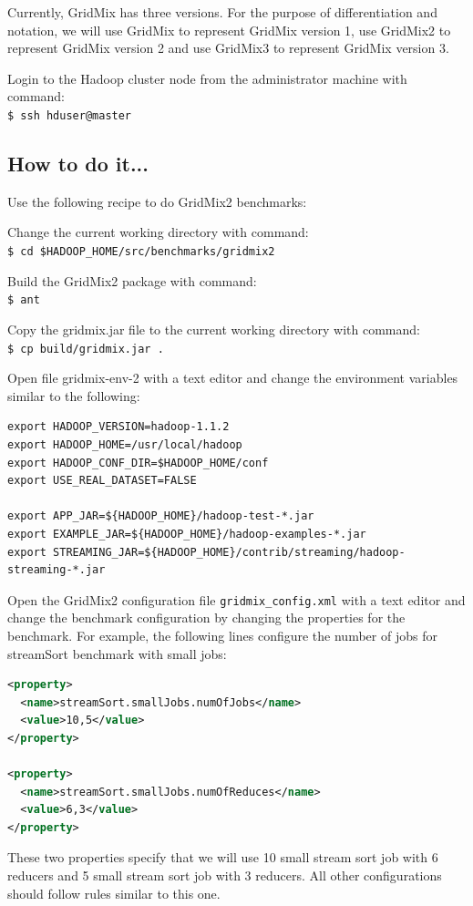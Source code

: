 Currently, GridMix has three versions. For the purpose of differentiation and notation, we will use GridMix to represent GridMix version 1, use GridMix2 to represent GridMix version 2 and use GridMix3 to represent GridMix version 3.

Login to the Hadoop cluster node from the administrator machine with command:\\
\verb|$ ssh hduser@master|
\subsection*{How to do it...}
Use the following recipe to do GridMix2 benchmarks:

Change the current working directory with command: \\
\verb|$ cd $HADOOP_HOME/src/benchmarks/gridmix2|

Build the GridMix2 package with command: \\
\verb|$ ant|

Copy the gridmix.jar file to the current working directory with command: \\
\verb|$ cp build/gridmix.jar .|

Open file gridmix-env-2 with a text editor and change the environment variables similar to the following:
\lstset{style=bashstyle}
\begin{lstlisting}
export HADOOP_VERSION=hadoop-1.1.2
export HADOOP_HOME=/usr/local/hadoop
export HADOOP_CONF_DIR=$HADOOP_HOME/conf
export USE_REAL_DATASET=FALSE

export APP_JAR=${HADOOP_HOME}/hadoop-test-*.jar
export EXAMPLE_JAR=${HADOOP_HOME}/hadoop-examples-*.jar
export STREAMING_JAR=${HADOOP_HOME}/contrib/streaming/hadoop-streaming-*.jar
\end{lstlisting}

Open the GridMix2 configuration file \verb|gridmix_config.xml| with a text editor and change the benchmark configuration by changing the properties for the benchmark. For example, the following lines configure the number of jobs for streamSort benchmark with small jobs:
\lstset{style=bashstyle}
\begin{lstlisting}[language=XML]
<property>
  <name>streamSort.smallJobs.numOfJobs</name>
  <value>10,5</value>
</property>

<property>
  <name>streamSort.smallJobs.numOfReduces</name>
  <value>6,3</value>
</property>
\end{lstlisting}
These two properties specify that we will use 10 small stream sort job with 6 reducers and 5 small stream sort job with 3 reducers. All other configurations should follow rules similar to this one.

